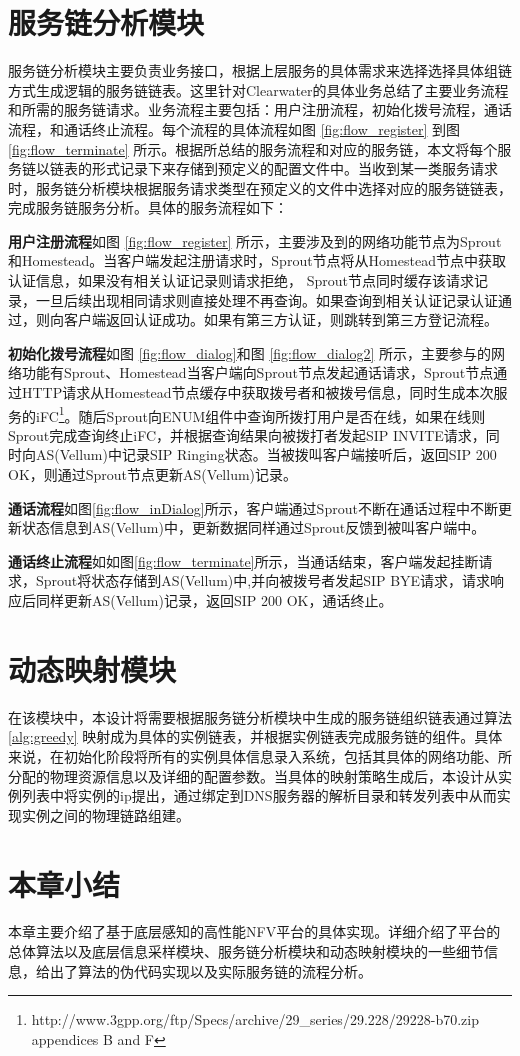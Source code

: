 \section{服务链分析模块}
服务链分析模块主要负责业务接口，根据上层服务的具体需求来选择选择具体组链方式生成逻辑的服务链链表。这里针对Clearwater的具体业务总结了主要业务流程和所需的服务链请求。业务流程主要包括：用户注册流程，初始化拨号流程，通话流程，和通话终止流程。每个流程的具体流程如图 \ref{fig:flow_register} 到图 \ref{fig:flow_terminate} 所示。根据所总结的服务流程和对应的服务链，本文将每个服务链以链表的形式记录下来存储到预定义的配置文件中。当收到某一类服务请求时，服务链分析模块根据服务请求类型在预定义的文件中选择对应的服务链链表，完成服务链服务分析。具体的服务流程如下：

\textbf{用户注册流程}如图 \ref{fig:flow_register} 所示，主要涉及到的网络功能节点为Sprout和Homestead。当客户端发起注册请求时，Sprout节点将从Homestead节点中获取认证信息，如果没有相关认证记录则请求拒绝， Sprout节点同时缓存该请求记录，一旦后续出现相同请求则直接处理不再查询。如果查询到相关认证记录认证通过，则向客户端返回认证成功。如果有第三方认证，则跳转到第三方登记流程。

\textbf{初始化拨号流程}如图 \ref{fig:flow_dialog}和图 \ref{fig:flow_dialog2} 所示，主要参与的网络功能有Sprout、Homestead当客户端向Sprout节点发起通话请求，Sprout节点通过HTTP请求从Homestead节点缓存中获取拨号者和被拨号信息，同时生成本次服务的iFC\footnote{http://www.3gpp.org/ftp/Specs/archive/29\_series/29.228/29228-b70.zip appendices B and F}。随后Sprout向ENUM组件中查询所拨打用户是否在线，如果在线则Sprout完成查询终止iFC，并根据查询结果向被拨打者发起SIP INVITE请求，同时向AS(Vellum)中记录SIP Ringing状态。当被拨叫客户端接听后，返回SIP 200 OK，则通过Sprout节点更新AS(Vellum)记录。

\textbf{通话流程}如图\ref{fig:flow_inDialog}所示，客户端通过Sprout不断在通话过程中不断更新状态信息到AS(Vellum)中，更新数据同样通过Sprout反馈到被叫客户端中。

\textbf{通话终止流程}如如图\ref{fig:flow_terminate}所示，当通话结束，客户端发起挂断请求，Sprout将状态存储到AS(Vellum)中,并向被拨号者发起SIP BYE请求，请求响应后同样更新AS(Vellum)记录，返回SIP 200 OK，通话终止。




\newpage
\section{动态映射模块}
在该模块中，本设计将需要根据服务链分析模块中生成的服务链组织链表通过算法 \ref{alg:greedy} 映射成为具体的实例链表，并根据实例链表完成服务链的组件。具体来说，在初始化阶段将所有的实例具体信息录入系统，包括其具体的网络功能、所分配的物理资源信息以及详细的配置参数。当具体的映射策略生成后，本设计从实例列表中将实例的ip提出，通过绑定到DNS服务器的解析目录和转发列表中从而实现实例之间的物理链路组建。


\section{本章小结}
本章主要介绍了基于底层感知的高性能NFV平台的具体实现。详细介绍了平台的总体算法以及底层信息采样模块、服务链分析模块和动态映射模块的一些细节信息，给出了算法的伪代码实现以及实际服务链的流程分析。